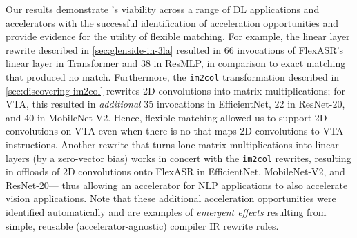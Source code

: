 Our results demonstrate \TLA's viability across a range of DL applications and accelerators with the successful identification of acceleration opportunities
%
and provide
evidence for the utility of flexible matching. %
%
%
%
For example, the linear layer rewrite described in \cref{sec:glenside-in-3la}
  resulted in 66 invocations of FlexASR's linear layer
  in Transformer and 38 in ResMLP, in comparison to exact matching that produced no match. 
Furthermore, 
  the \texttt{im2col} transformation described in
  \cref{sec:discovering-im2col}
  rewrites 2D convolutions into matrix multiplications;
for VTA, this resulted in \emph{additional} 35 invocations in EfficientNet, 22 in ResNet-20, and 40 in MobileNet-V2.
Hence, flexible matching allowed us to support 2D convolutions on VTA even when 
there is no \mapping that maps 2D convolutions to VTA instructions.
Another rewrite
  that turns lone matrix multiplications
  into linear layers
  (by a zero-vector bias)
  works in concert with the \texttt{im2col} rewrites,
  resulting in offloads of 2D convolutions
  onto FlexASR  
  in EfficientNet, MobileNet-V2, and ResNet-20---%
  thus allowing an accelerator for NLP applications
  to also accelerate vision applications.
%
Note that these additional acceleration opportunities
  were identified automatically
  and are examples of \textit{emergent effects} resulting from simple, reusable (accelerator-agnostic) compiler IR rewrite rules.

